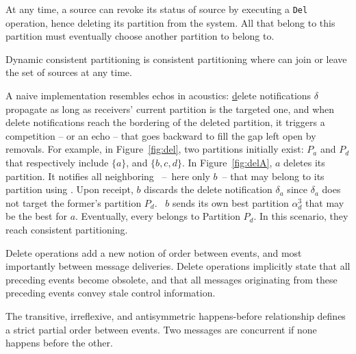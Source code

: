 

At any time, a source can revoke its status of source by executing a
\texttt{Del} operation, hence deleting its partition from the
system. All \processes that belong to this partition must eventually
choose another partition to belong to.

\begin{definition}
  Dynamic consistent partitioning is consistent partitioning where
  \processes can join or leave the set of sources at any time.
\end{definition}



A naive implementation resembles echos in acoustics:
\underline{d}elete notifications $\delta$ propagate as long as
receivers' current partition is the targeted one, and when delete
notifications reach the bordering \processes of the deleted partition,
it triggers a competition -- or an echo -- that goes backward to fill
the gap left open by removals.  For example, in Figure~\ref{fig:del},
two partitions initially exist: $P_a$ and $P_d$ that respectively
include $\{a\}$, and $\{b, c, d\}$. In Figure~\ref{fig:delA}, $a$
deletes its partition. It notifies all neighboring \processes~--~here
only $b$~-- that may belong to its partition using \NAMEB. Upon
receipt, $b$ discards the delete notification $\delta_a$ since
$\delta_a$ does not target the former's partition $P_d$. \Process~$b$
sends its own best partition $\alpha_d^3$ that may be the best for
$a$. Eventually, every \process belongs to Partition $P_d$. In this
scenario, they reach consistent partitioning.

Delete operations add a new notion of order between events, and most
importantly between message deliveries. Delete operations implicitly
state that all preceding events become obsolete, and that all messages
originating from these preceding events convey stale control
information.



\begin{definition}
  The transitive, irreflexive, and antisymmetric happens-before
  relationship defines a strict partial order between events. Two
  messages are concurrent if none happens before the other.
\end{definition}

